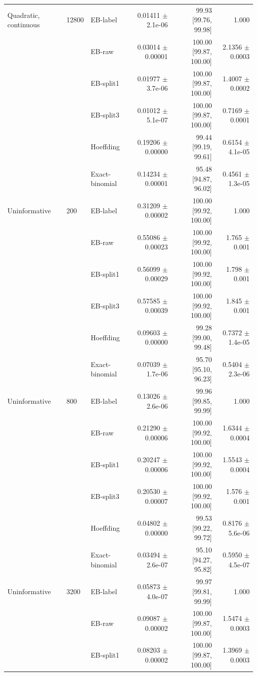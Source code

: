 \begin{longtable}{lllrrr}
Quadratic, continuous & 12800 & EB-label & 0.01411 $\pm$ 2.1e-06 & 99.93 [99.76, 99.98] & 1.000 \\
 &  & EB-raw & 0.03014 $\pm$ 0.00001 & 100.00 [99.87, 100.00] & 2.1356 $\pm$ 0.0003 \\
 &  & EB-split1 & 0.01977 $\pm$ 3.7e-06 & 100.00 [99.87, 100.00] & 1.4007 $\pm$ 0.0002 \\
 &  & EB-split3 & 0.01012 $\pm$ 5.1e-07 & 100.00 [99.87, 100.00] & 0.7169 $\pm$ 0.0001 \\
 &  & Hoeffding & 0.19206 $\pm$ 0.00000 & 99.44 [99.19, 99.61] & 0.6154 $\pm$ 4.1e-05 \\
 &  & Exact-binomial & 0.14234 $\pm$ 0.00001 & 95.48 [94.87, 96.02] & 0.4561 $\pm$ 1.3e-05 \\
Uninformative & 200 & EB-label & 0.31209 $\pm$ 0.00002 & 100.00 [99.92, 100.00] & 1.000 \\
 &  & EB-raw & 0.55086 $\pm$ 0.00023 & 100.00 [99.92, 100.00] & 1.765 $\pm$ 0.001 \\
 &  & EB-split1 & 0.56099 $\pm$ 0.00029 & 100.00 [99.92, 100.00] & 1.798 $\pm$ 0.001 \\
 &  & EB-split3 & 0.57585 $\pm$ 0.00039 & 100.00 [99.92, 100.00] & 1.845 $\pm$ 0.001 \\
 &  & Hoeffding & 0.09603 $\pm$ 0.00000 & 99.28 [99.00, 99.48] & 0.7372 $\pm$ 1.4e-05 \\
 &  & Exact-binomial & 0.07039 $\pm$ 1.7e-06 & 95.70 [95.10, 96.23] & 0.5404 $\pm$ 2.3e-06 \\
Uninformative & 800 & EB-label & 0.13026 $\pm$ 2.6e-06 & 99.96 [99.85, 99.99] & 1.000 \\
 &  & EB-raw & 0.21290 $\pm$ 0.00006 & 100.00 [99.92, 100.00] & 1.6344 $\pm$ 0.0004 \\
 &  & EB-split1 & 0.20247 $\pm$ 0.00006 & 100.00 [99.92, 100.00] & 1.5543 $\pm$ 0.0004 \\
 &  & EB-split3 & 0.20530 $\pm$ 0.00007 & 100.00 [99.92, 100.00] & 1.576 $\pm$ 0.001 \\
 &  & Hoeffding & 0.04802 $\pm$ 0.00000 & 99.53 [99.22, 99.72] & 0.8176 $\pm$ 5.6e-06 \\
 &  & Exact-binomial & 0.03494 $\pm$ 2.6e-07 & 95.10 [94.27, 95.82] & 0.5950 $\pm$ 4.5e-07 \\
Uninformative & 3200 & EB-label & 0.05873 $\pm$ 4.0e-07 & 99.97 [99.81, 99.99] & 1.000 \\
 &  & EB-raw & 0.09087 $\pm$ 0.00002 & 100.00 [99.87, 100.00] & 1.5474 $\pm$ 0.0003 \\
 &  & EB-split1 & 0.08203 $\pm$ 0.00002 & 100.00 [99.87, 100.00] & 1.3969 $\pm$ 0.0003 \\

\end{longtable}
